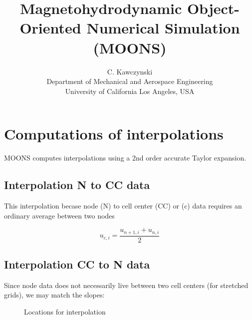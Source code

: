 \documentclass[11pt]{article}
\newcommand{\height}{0.4}
\newcommand{\radius}{0.1}
\newcommand{\offSet}{12}
\newcommand{\Deltah}{3}
\begin{document}
\doublespacing
\title{Magnetohydrodynamic Object-Oriented Numerical Simulation (MOONS)}
\author{C. Kawczynski \\
Department of Mechanical and Aerospace Engineering \\
University of California Los Angeles, USA\\
}
\maketitle

\section{Computations of interpolations}
MOONS computes interpolations using a 2nd order accurate Taylor expansion.

\subsection{Interpolation N to CC data}
This interpolation becase node (N) to cell center (CC) or (c) data requires an ordinary average between two nodes

\begin{equation}
	u_{c,i} = \frac{u_{n+1,i}+u_{n,i}}{2}
\end{equation}

\subsection{Interpolation CC to N data}
Since node data does not necessarily live between two cell centers (for stretched grids), we may match the slopes:

\begin{figure}[h!]
  \begin{center}
    \caption{Locations for interpolation}
  \end{center}
\end{figure}
\end{document}
